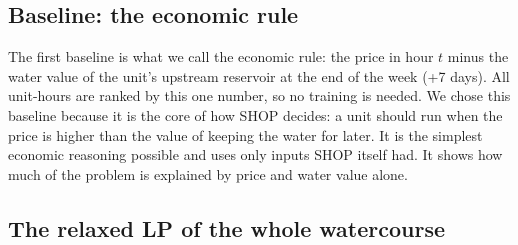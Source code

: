 \subsection{Baseline: the economic rule}\label{sec:5.rule}

The first baseline is what we call the economic rule: the price in hour $t$ minus the water value of the unit's upstream reservoir at the end of the week (+7 days). All unit-hours are ranked by this one number, so no training is needed. We chose this baseline because it is the core of how SHOP decides: a unit should run when the price is higher than the value of keeping the water for later. It is the simplest economic reasoning possible and uses only inputs SHOP itself had. It shows how much of the problem is explained by price and water value alone.

\subsection{The relaxed LP of the whole watercourse}\label{sec:5.lp}

